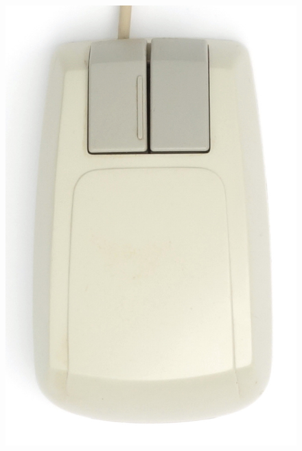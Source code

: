 \documentclass[11pt, a4paper]{article}
\begin{document}
\begin{figure}[h]
    \centering
    \includegraphics[scale=0.55]{1989_vatek_color_mouse/top_30.jpg}

\end{figure}
\end{document}
